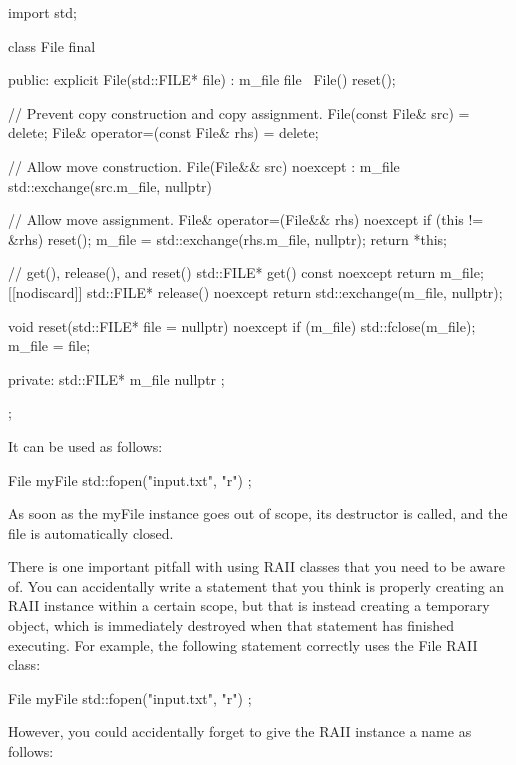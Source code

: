 \begin{cpp}
import std;

class File final
{
    public:
        explicit File(std::FILE* file) : m_file { file } { }
        ~File() { reset(); }

        // Prevent copy construction and copy assignment.
        File(const File& src) = delete;
        File& operator=(const File& rhs) = delete;

        // Allow move construction.
        File(File&& src) noexcept : m_file { std::exchange(src.m_file, nullptr) }
        {
        }

        // Allow move assignment.
        File& operator=(File&& rhs) noexcept
        {
            if (this != &rhs) {
                reset();
                m_file = std::exchange(rhs.m_file, nullptr);
            }
            return *this;
        }

        // get(), release(), and reset()
        std::FILE* get() const noexcept { return m_file; }
        [[nodiscard]] std::FILE* release() noexcept
        {
            return std::exchange(m_file, nullptr);
        }

        void reset(std::FILE* file = nullptr) noexcept
        {
            if (m_file) { std::fclose(m_file); }
            m_file = file;
        }

    private:
        std::FILE* m_file { nullptr };
};
\end{cpp}

It can be used as follows:

\begin{cpp}
File myFile { std::fopen("input.txt", "r") };
\end{cpp}

As soon as the myFile instance goes out of scope, its destructor is called, and the file is automatically closed.

There is one important pitfall with using RAII classes that you need to be aware of. You can accidentally write a statement that you think is properly creating an RAII instance within a certain scope, but that is instead creating a temporary object, which is immediately destroyed when that statement has finished executing. For example, the following statement correctly uses the File RAII class:

\begin{cpp}
File myFile { std::fopen("input.txt", "r") };
\end{cpp}

However, you could accidentally forget to give the RAII instance a name as follows:

